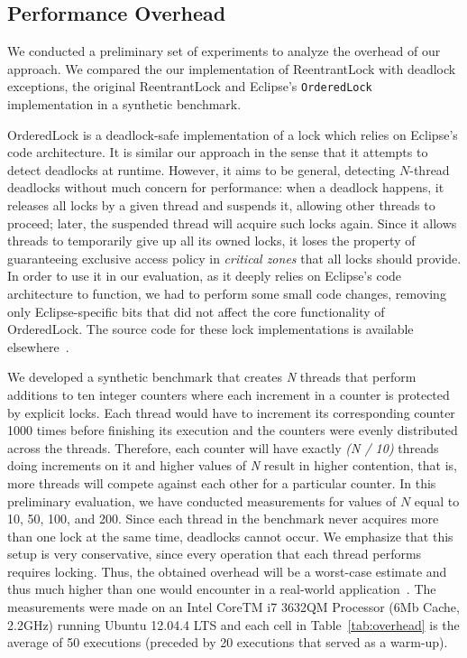 \subsection{Performance Overhead}\label{sec:perf}

We conducted a preliminary set of experiments to analyze the overhead of our approach.
We compared the our implementation of ReentrantLock with deadlock exceptions, the original ReentrantLock and Eclipse's {\tt OrderedLock}~\cite{orderedlock} implementation in a synthetic benchmark.

OrderedLock is a deadlock-safe implementation of a lock which relies on Eclipse's code architecture.
It is similar our approach in the sense that it attempts to detect deadlocks at runtime. However, it aims to be general, detecting $N$-thread deadlocks without much concern for performance: when a deadlock happens, it releases all locks by a given thread and suspends it, allowing other threads to proceed;
later, the suspended thread will acquire such locks again.
Since it allows threads to temporarily give up all its owned locks, it loses the property of guaranteeing exclusive access policy in \emph{critical zones} that all locks should provide.
In order to use it in our evaluation, as it deeply relies on Eclipse's code architecture to function, we had to perform some small code changes, removing only Eclipse-specific bits that did not affect the core functionality of OrderedLock.
The source code for these lock implementations is available elsewhere~\cite{repo}.

We developed a synthetic benchmark that creates \emph{N} threads that perform additions to ten integer counters where each increment in a counter is protected by explicit locks. Each thread would have to increment its corresponding counter 1000 times before finishing its execution and the counters were evenly distributed across the threads. Therefore, each counter will have exactly \emph{(N / 10)} threads doing increments on it and higher values of \emph{N} result in higher contention, that is, more threads will compete against each other for a particular counter. In this preliminary evaluation, we have conducted measurements for values of $N$ equal to 10, 50, 100, and 200. Since each thread in the benchmark never acquires more than one lock at the same time, deadlocks cannot occur. We emphasize that this setup is very conservative, since every operation that each thread performs requires locking. Thus, the obtained overhead will be a worst-case estimate and thus much higher than one would encounter in a real-world application~\cite{lozi}. The measurements were made on an Intel CoreTM i7 3632QM Processor (6Mb Cache, 2.2GHz) running Ubuntu 12.04.4 LTS and each cell in Table~\ref{tab:overhead} is the average of 50 executions (preceded by 20 executions that served as a warm-up).

